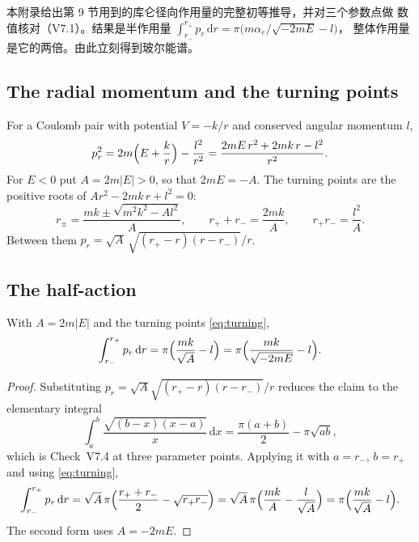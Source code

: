 
\begin{cnread}
本附录给出第 9 节用到的库仑径向作用量的完整初等推导，并对三个参数点做
数值核对（V7.1）。结果是半作用量
$\int_{r_-}^{r_+}p_r\,\mathrm dr=\pi\bigl(m\alpha_e/\sqrt{-2mE}-l\bigr)$，
整体作用量是它的两倍。由此立刻得到玻尔能谱。
\end{cnread}

\subsection{The radial momentum and the turning points}

For a Coulomb pair with potential $V=-k/r$ and conserved angular momentum $l$,
\begin{equation}\label{eq:pr}
  p_r^{2}=2m\Bigl(E+\frac kr\Bigr)-\frac{l^{2}}{r^{2}}
  =\frac{2mE\,r^{2}+2mk\,r-l^{2}}{r^{2}} .
\end{equation}
For $E<0$ put $A=2m|E|>0$, so that $2mE=-A$.  The turning points are the positive
roots of $Ar^{2}-2mk\,r+l^{2}=0$:
\begin{equation}\label{eq:turning}
  r_{\pm}=\frac{mk\pm\sqrt{m^{2}k^{2}-Al^{2}}}{A},
  \qquad
  r_++r_-=\frac{2mk}{A},
  \qquad
  r_+r_-=\frac{l^{2}}{A} .
\end{equation}
Between them $p_r=\sqrt A\,\sqrt{(r_+-r)(r-r_-)}/r$.

\subsection{The half-action}

\begin{lemma}
\label{lem:half-action}
With $A=2m|E|$ and the turning points \eqref{eq:turning},
\begin{equation}\label{eq:half-action}
  \int_{r_-}^{r_+}p_r\,\mathrm dr
  =\pi\Bigl(\frac{mk}{\sqrt{A}}-l\Bigr)
  =\pi\Bigl(\frac{mk}{\sqrt{-2mE}}-l\Bigr).
\end{equation}
\end{lemma}

\begin{proof}
Substituting $p_r=\sqrt A\sqrt{(r_+-r)(r-r_-)}/r$ reduces the claim to the
elementary integral
\begin{equation}\label{eq:elementary}
  \int_{a}^{b}\frac{\sqrt{(b-x)(x-a)}}{x}\,\mathrm dx
  =\frac{\pi(a+b)}{2}-\pi\sqrt{ab},
\end{equation}
which is Check~V7.4 at three parameter points.  Applying it with $a=r_-$,
$b=r_+$ and using \eqref{eq:turning},
\[
  \int_{r_-}^{r_+}p_r\,\mathrm dr
  =\sqrt A\,\pi\Bigl(\frac{r_++r_-}{2}-\sqrt{r_+r_-}\Bigr)
  =\sqrt A\,\pi\Bigl(\frac{mk}{A}-\frac{l}{\sqrt A}\Bigr)
  =\pi\Bigl(\frac{mk}{\sqrt A}-l\Bigr).
\]
The second form uses $A=-2mE$.
\end{proof}

